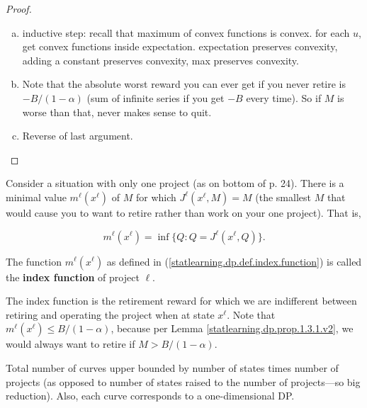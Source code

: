 \begin{proof}

\begin{enumerate}[(a)]

\item inductive step: recall that maximum of convex functions is convex. for each \(u\), get convex functions inside expectation. expectation preserves convexity, adding a constant preserves convexity, max preserves convexity. 

\item Note that the absolute worst reward you can ever get if you never retire is \(-B/(1-\alpha)\) (sum of infinite series if you get \(-B\) every time). So if \(M\) is worse than that, never makes sense to quit. 

\item Reverse of last argument.

\end{enumerate}

\end{proof}

Consider a situation with only one project (as on bottom of p. 24). There is a minimal value \(m^\ell(x^\ell)\) of \(M\) for which \(J^\ell(x^\ell, M) = M\) (the smallest \(M\) that would cause you to want to retire rather than work on your one project). That is,

\begin{equation}\label{statlearning.dp.def.index.function}
m^\ell(x^\ell) = \inf\{Q : Q =  J^\ell(x^\ell, Q)  \}.
\end{equation}

\begin{definition}

The function \(m^\ell(x^\ell)\) as defined in (\ref{statlearning.dp.def.index.function}) is called the \textbf{index function} of project \(\ell\).

\end{definition}

The index function is the retirement reward for which we are indifferent between retiring and operating the project when at state \(x^\ell\). Note that \(m^\ell(x^\ell) \leq B/(1-\alpha)\), because per Lemma \ref{statlearning.dp.prop.1.3.1.v2}, we would always want to retire if \(M > B/(1-\alpha)\).

Total number of curves upper bounded by number of states times number of projects (as opposed to number of states raised to the number of projects---so big reduction). Also, each curve corresponds to a one-dimensional DP.

